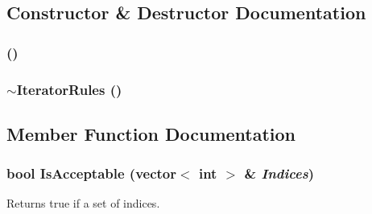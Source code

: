 \subsection{Constructor \& Destructor Documentation}
\hypertarget{classJKBuilder_1_1IteratorRules_ae657e753967d73a7b2966dccb364682b}{
\subsubsection[{IteratorRules}]{ ()}}
\label{classJKBuilder_1_1IteratorRules_ae657e753967d73a7b2966dccb364682b}
\hypertarget{classJKBuilder_1_1IteratorRules_a59f6acedab9a2a18057b88a2c4d6df92}{
\subsubsection[{$\sim$IteratorRules}]{\setlength{\rightskip}{0pt plus 5cm}$\sim${\bf IteratorRules} ()}}
\label{classJKBuilder_1_1IteratorRules_a59f6acedab9a2a18057b88a2c4d6df92}


\subsection{Member Function Documentation}
\hypertarget{classJKBuilder_1_1IteratorRules_ae197a0b320460b5c5d42d58bc921ddbc}{
\subsubsection[{IsAcceptable}]{\setlength{\rightskip}{0pt plus 5cm}bool IsAcceptable (vector$<$ int $>$ \& {\em Indices})}}
\label{classJKBuilder_1_1IteratorRules_ae197a0b320460b5c5d42d58bc921ddbc}


Returns true if a set of indices. 

